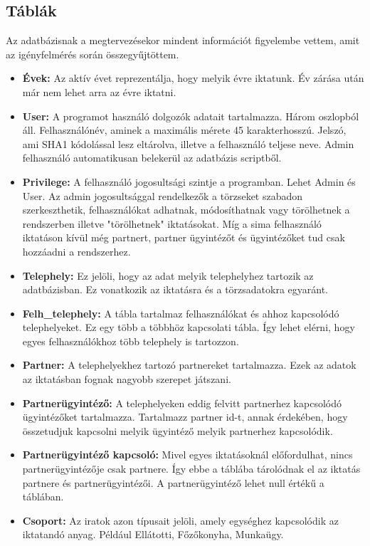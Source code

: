\documentclass[
]{thesis-ekf}
\theoremstyle{definition}
\theoremstyle{remark}
\begin{document}
\subsection{Táblák}
Az adatbázisnak a megtervezésekor mindent információt figyelembe vettem, amit az igényfelmérés során összegyűjtöttem. 
\begin{itemize}[leftmargin=0pt]
\item[] \textbf{Évek: }	Az aktív évet reprezentálja, hogy melyik évre iktatunk. Év zárása után már nem lehet arra az évre iktatni.
\item[] \textbf{User: }	A programot használó dolgozók adatait tartalmazza. Három oszlopból áll. Felhasználónév, aminek a maximális mérete 45 karakterhosszú. Jelszó, ami SHA1 kódolással lesz eltárolva, illetve a felhasználó teljese neve. Admin felhasználó automatikusan belekerül az adatbázis scriptből.
\item[] \textbf{Privilege: }A felhasználó jogosultsági szintje a programban. Lehet Admin és User. Az admin jogosultsággal rendelkezők a törzseket szabadon szerkeszthetik, felhasználókat adhatnak, módosíthatnak vagy törölhetnek a rendszerben illetve "törölhetnek" iktatásokat. Míg a sima felhasználó iktatáson kívül még partnert, partner ügyintézőt és ügyintézőket tud csak hozzáadni a rendszerhez.
\item[] \textbf{Telephely: }Ez jelöli, hogy az adat melyik telephelyhez tartozik az adatbázisban. Ez vonatkozik az iktatásra és a törzsadatokra egyaránt.	
\item[] \textbf{Felh\_telephely: }A tábla tartalmaz felhasználókat és ahhoz kapcsolódó telephelyeket. Ez egy több a többhöz kapcsolati tábla. Így lehet elérni, hogy egyes felhasználókhoz több telephely is tartozzon.	
\item[] \textbf{Partner: }A telephelyekhez tartozó partnereket tartalmazza. Ezek az adatok az iktatásban fognak nagyobb szerepet játszani.
\item[] \textbf{Partnerügyintéző: }A telephelyeken eddig felvitt partnerhez kapcsolódó ügyintézőket tartalmazza. Tartalmazz partner id-t, annak érdekében, hogy összetudjuk kapcsolni melyik ügyintéző melyik partnerhez kapcsolódik.
\item[] \textbf{Partnerügyintéző kapcsoló: }Mivel egyes iktatásoknál előfordulhat, nincs partnerügyintézője csak partnere. Így ebbe a táblába tárolódnak el az iktatás partnere és partnerügyintézői. A partnerügyintéző lehet  null értékű a táblában.	
\item[] \textbf{Csoport: }Az iratok azon típusait jelöli, amely egységhez kapcsolódik az iktatandó anyag. Például Ellátotti, Főzőkonyha, Munkaügy.	

\end{itemize}
\end{document}
